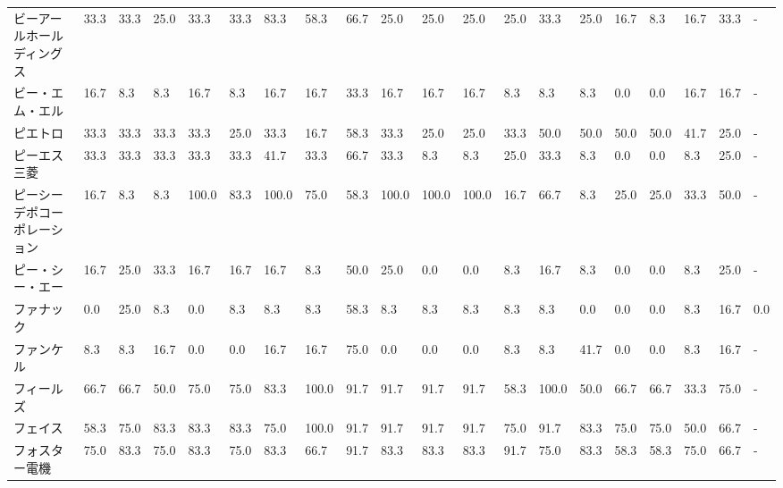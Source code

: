 \begin{tabular}{llllllllllllllllllll}
ビーアールホールディングス   &   33.3 &   33.3 &      25.0 &      33.3 &       33.3 &   83.3 &   58.3 &   66.7 &    25.0 &    25.0 &   25.0 &  25.0 &   33.3 &    25.0 &    16.7 &   8.3 &  16.7 &  33.3 &     - \\
ビー・エム・エル        &   16.7 &    8.3 &       8.3 &      16.7 &        8.3 &   16.7 &   16.7 &   33.3 &    16.7 &    16.7 &   16.7 &   8.3 &    8.3 &     8.3 &     0.0 &   0.0 &  16.7 &  16.7 &     - \\
ピエトロ            &   33.3 &   33.3 &      33.3 &      33.3 &       25.0 &   33.3 &   16.7 &   58.3 &    33.3 &    25.0 &   25.0 &  33.3 &   50.0 &    50.0 &    50.0 &  50.0 &  41.7 &  25.0 &     - \\
ピーエス三菱          &   33.3 &   33.3 &      33.3 &      33.3 &       33.3 &   41.7 &   33.3 &   66.7 &    33.3 &     8.3 &    8.3 &  25.0 &   33.3 &     8.3 &     0.0 &   0.0 &   8.3 &  25.0 &     - \\
ピーシーデポコーポレーション  &   16.7 &    8.3 &       8.3 &     100.0 &       83.3 &  100.0 &   75.0 &   58.3 &   100.0 &   100.0 &  100.0 &  16.7 &   66.7 &     8.3 &    25.0 &  25.0 &  33.3 &  50.0 &     - \\
ピー・シー・エー        &   16.7 &   25.0 &      33.3 &      16.7 &       16.7 &   16.7 &    8.3 &   50.0 &    25.0 &     0.0 &    0.0 &   8.3 &   16.7 &     8.3 &     0.0 &   0.0 &   8.3 &  25.0 &     - \\
ファナック           &    0.0 &   25.0 &       8.3 &       0.0 &        8.3 &    8.3 &    8.3 &   58.3 &     8.3 &     8.3 &    8.3 &   8.3 &    8.3 &     0.0 &     0.0 &   0.0 &   8.3 &  16.7 &   0.0 \\
ファンケル           &    8.3 &    8.3 &      16.7 &       0.0 &        0.0 &   16.7 &   16.7 &   75.0 &     0.0 &     0.0 &    0.0 &   8.3 &    8.3 &    41.7 &     0.0 &   0.0 &   8.3 &  16.7 &     - \\
フィールズ           &   66.7 &   66.7 &      50.0 &      75.0 &       75.0 &   83.3 &  100.0 &   91.7 &    91.7 &    91.7 &   91.7 &  58.3 &  100.0 &    50.0 &    66.7 &  66.7 &  33.3 &  75.0 &     - \\
フェイス            &   58.3 &   75.0 &      83.3 &      83.3 &       83.3 &   75.0 &  100.0 &   91.7 &    91.7 &    91.7 &   91.7 &  75.0 &   91.7 &    83.3 &    75.0 &  75.0 &  50.0 &  66.7 &     - \\
フォスター電機         &   75.0 &   83.3 &      75.0 &      83.3 &       75.0 &   83.3 &   66.7 &   91.7 &    83.3 &    83.3 &   83.3 &  91.7 &   75.0 &    83.3 &    58.3 &  58.3 &  75.0 &  66.7 &     - \\

\end{tabular}
